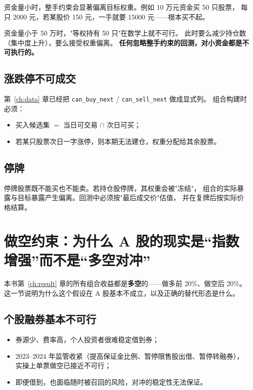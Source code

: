 资金量小时，整手约束会显著偏离目标权重。例如 10 万元资金买 50 只股票，
每只 2000 元，若某股价 150 元，一手就要 15000 元——根本买不起。

\begin{warnbox}[小资金的核心矛盾]
资金量小于 50 万时，"等权持有 50 只"在数学上就不可行。
此时要么减少持仓数（集中度上升），要么接受权重偏离。
\textbf{任何忽略整手约束的回测，对小资金都是不可执行的。}
\end{warnbox}

\subsection{涨跌停不可成交}

第~\ref{ch:data} 章已经把 \texttt{can\_buy\_next} / \texttt{can\_sell\_next} 做成显式列。
组合构建时必须：
\begin{itemize}
  \item 买入候选集 $=$ 当日可交易 $\cap$ 次日可买；
  \item 若某只股票次日一字涨停，则本期无法建仓，权重分配给其余股票。
\end{itemize}

\subsection{停牌}

停牌股票既不能买也不能卖。若持仓股停牌，其权重会被"冻结"，
组合的实际暴露与目标暴露产生偏离。回测中必须按"最后成交价"估值，
并在复牌后按实际价格结算。

\section{做空约束：为什么 A 股的现实是“指数增强”而不是“多空对冲”}

本书第~\ref{ch:result} 章的所有组合收益都是\textbf{多空}的——做多前 20\%、做空后 20\%。
这一节说明为什么这个假设在 A 股基本不成立，以及正确的替代形态是什么。

\subsection{个股融券基本不可行}

\begin{itemize}
  \item 券源少、费率高，个人投资者很难稳定借到券；
  \item 2023--2024 年监管收紧（提高保证金比例、暂停限售股出借、暂停转融券），
        实操上单票做空已接近不可行；
  \item 即便借到，也面临随时被召回的风险，对冲的稳定性无法保证。
\end{itemize}

